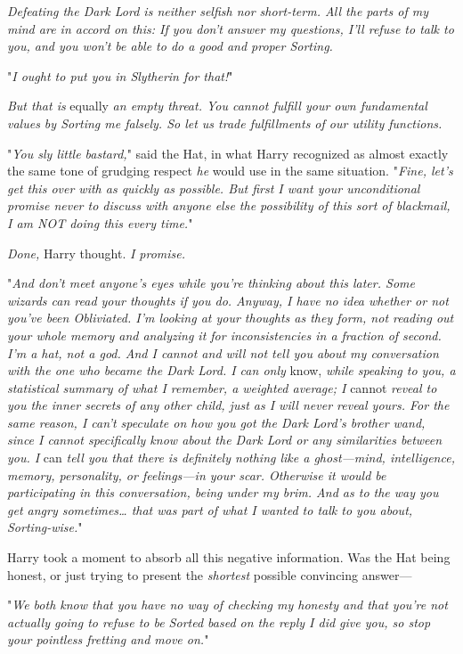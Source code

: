 \emph{Defeating the Dark Lord is neither selfish nor short-term. All the parts
of my mind are in accord on this: If you don't answer my questions, I'll refuse
to talk to you, and you won't be able to do a good and proper Sorting.}

"\emph{I ought to put you in Slytherin for that!}"

\emph{But that is} equally \emph{an empty threat. You cannot fulfill your own
fundamental values by Sorting me falsely. So let us trade fulfillments of our
utility functions.}

"\emph{You sly little bastard,}" said the Hat, in what Harry recognized as
almost exactly the same tone of grudging respect \emph{he} would use in the
same situation. "\emph{Fine, let's get this over with as quickly as possible.
But first I want your unconditional promise never to discuss with anyone else
the possibility of this sort of blackmail, I am NOT doing this every time.}"

\emph{Done,} Harry thought. \emph{I promise.}

"\emph{And don't meet anyone's eyes while you're thinking about this later.
Some wizards can read your thoughts if you do. Anyway, I have no idea whether
or not you've been Obliviated. I'm looking at your thoughts as they form, not
reading out your whole memory and analyzing it for inconsistencies in a
fraction of second. I'm a hat, not a god. And I cannot and will not tell you
about my conversation with the one who became the Dark Lord. I can only}
know, \emph{while speaking to you, a statistical summary of what I remember, a
weighted average; I} cannot \emph{reveal to you the inner secrets of any other
child, just as I will never reveal yours. For the same reason, I can't
speculate on how you got the Dark Lord's brother wand, since I cannot
specifically know about the Dark Lord or any similarities between you. I}
can \emph{tell you that there is definitely nothing like a ghost---mind,
intelligence, memory, personality, or feelings---in your scar. Otherwise it
would be participating in this conversation, being under my brim. And as to the
way you get angry sometimes{\ldots} that was part of what I wanted to talk to
you about, Sorting-wise.}"

Harry took a moment to absorb all this negative information. Was the Hat being
honest, or just trying to present the \emph{shortest} possible convincing
answer---

"\emph{We both know that you have no way of checking my honesty and that you're
not actually going to refuse to be Sorted based on the reply I did give you, so
stop your pointless fretting and move on.}"

